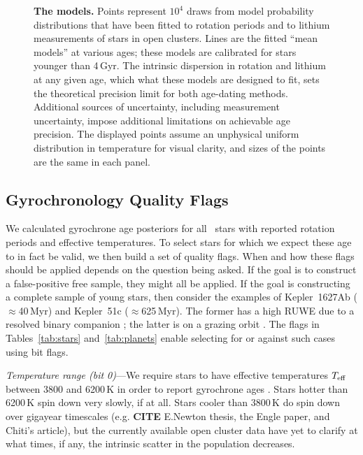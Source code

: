 \documentclass[11pt,twocolumn,tighten]{aastex63}
\begin{document}
\begin{figure}[!t]
	\begin{center}
		\leavevmode
	\end{center}
	\vspace{-0.6cm}
	\caption{
		{\bf The models.}
		Points represent $10^4$ draws from model probability distributions
		that have been fitted to rotation periods 
		\citep{Bouma_2023} and to lithium measurements \citep{Jeffries_2023}
		of stars in open clusters.
		Lines are the fitted ``mean models'' at various ages; these models are calibrated
		for stars younger than 4\,Gyr.
		The intrinsic dispersion in rotation and lithium at any given age, which what these models are designed to fit, sets
		the theoretical precision limit for both age-dating methods.
		Additional sources of uncertainty, including measurement uncertainty,
		impose additional limitations on achievable age precision.
		The displayed points assume an unphysical uniform distribution in
		temperature for visual clarity, and sizes of the points are the same in each panel.
		\label{fig:models}
	}
\end{figure}


\subsection{Gyrochronology Quality Flags}
\label{subsec:flags}
We calculated gyrochrone age posteriors for all \nuniqstarsantosrot\
stars with reported rotation periods and effective temperatures.  To
select stars for which we expect these age to in fact be valid, we
then build a set of quality flags.  When and how these flags should be
applied depends on the question being asked.  If the goal is to
construct a false-positive free sample, they might all be applied.  If
the goal is constructing a complete sample of young stars, then
consider the examples of Kepler~1627Ab ($\approx$40\,Myr) and
Kepler~51c ($\approx$625\,Myr).  The former has a high RUWE due to a
resolved binary companion \citep{Bouma_2022a}; the latter is on a
grazing orbit \citep{2014ApJ...783...53M}.  The flags in
Tables~\ref{tab:stars} and~\ref{tab:planets} enable selecting for or
against such cases using bit flags.

{\it Temperature range (bit 0)}---We require stars to have effective
temperatures $T_{\rm eff}$ between 3800 and 6200\,K in order to report
gyrochrone ages \citep{Bouma_2023}.   Stars hotter than 6200\,K spin
down very slowly, if at all.  Stars cooler than 3800\,K do spin down
over gigayear timescales (e.g. {\bf CITE} E.Newton thesis, the Engle
paper, and Chiti's article), but the currently available open cluster
data have yet to clarify at what times, if any, the intrinsic scatter
in the population decreases.
\end{document}
